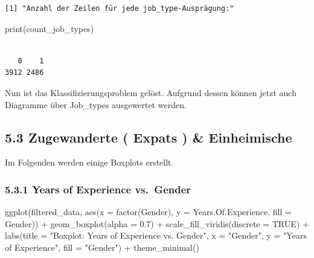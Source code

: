 \documentclass[
  letterpaper,
  DIV=11,
  numbers=noendperiod]{scrartcl}
\newenvironment{Shaded}{\begin{snugshade}}{\end{snugshade}}
\newcommand{\AttributeTok}[1]{\textcolor[rgb]{0.40,0.45,0.13}{#1}}
\newcommand{\ConstantTok}[1]{\textcolor[rgb]{0.56,0.35,0.01}{#1}}
\newcommand{\FloatTok}[1]{\textcolor[rgb]{0.68,0.00,0.00}{#1}}
\newcommand{\FunctionTok}[1]{\textcolor[rgb]{0.28,0.35,0.67}{#1}}
\newcommand{\NormalTok}[1]{\textcolor[rgb]{0.00,0.23,0.31}{#1}}
\newcommand{\SpecialCharTok}[1]{\textcolor[rgb]{0.37,0.37,0.37}{#1}}
\newcommand{\StringTok}[1]{\textcolor[rgb]{0.13,0.47,0.30}{#1}}
\begin{document}
\begin{verbatim}
[1] "Anzahl der Zeilen für jede job_type-Ausprägung:"
\end{verbatim}

\begin{Shaded}
\begin{Highlighting}[]
\FunctionTok{print}\NormalTok{(count\_job\_types)}
\end{Highlighting}
\end{Shaded}

\begin{verbatim}

   0    1 
3912 2486 
\end{verbatim}

Nun ist das Klassifizierungsproblem gelöst. Aufgrund dessen können jetzt
auch Diagramme über Job\_types ausgewertet werden.

\hypertarget{zugewanderte-expats-einheimische}{%
\subsection{5.3 Zugewanderte ( Expats ) \&
Einheimische}\label{zugewanderte-expats-einheimische}}

Im Folgenden werden einige Boxplots erstellt.

\hypertarget{years-of-experience-vs.-gender}{%
\subsubsection{5.3.1 Years of Experience
vs.~Gender}\label{years-of-experience-vs.-gender}}

\begin{Shaded}
\begin{Highlighting}[]
\FunctionTok{ggplot}\NormalTok{(filtered\_data, }\FunctionTok{aes}\NormalTok{(}\AttributeTok{x =} \FunctionTok{factor}\NormalTok{(Gender), }\AttributeTok{y =}\NormalTok{ Years.Of.Experience, }\AttributeTok{fill =}\NormalTok{ Gender)) }\SpecialCharTok{+}
  \FunctionTok{geom\_boxplot}\NormalTok{(}\AttributeTok{alpha =} \FloatTok{0.7}\NormalTok{) }\SpecialCharTok{+}
  \FunctionTok{scale\_fill\_viridis}\NormalTok{(}\AttributeTok{discrete =} \ConstantTok{TRUE}\NormalTok{) }\SpecialCharTok{+}
  \FunctionTok{labs}\NormalTok{(}\AttributeTok{title =} \StringTok{"Boxplot: Years of Experience vs. Gender"}\NormalTok{,}
       \AttributeTok{x =} \StringTok{"Gender"}\NormalTok{,}
       \AttributeTok{y =} \StringTok{"Years of Experience"}\NormalTok{,}
       \AttributeTok{fill =} \StringTok{"Gender"}\NormalTok{) }\SpecialCharTok{+}
  \FunctionTok{theme\_minimal}\NormalTok{()}
\end{Highlighting}
\end{Shaded}
\end{document}
